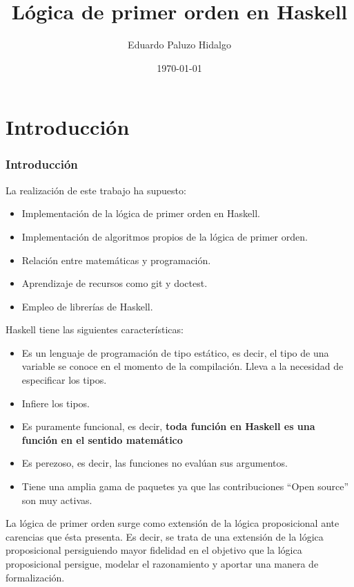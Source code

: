 \documentclass{beamer}
\title[LPO en Haskell]{Lógica de primer orden en Haskell}
\author[Eduardo P.]{Eduardo Paluzo Hidalgo}
\institute[US]{Universidad de Sevilla}
\date{\today}
\begin{document}
 
\frame{\titlepage}

\frame{\tableofcontents}
\section{Introducción}
\begin{frame}
  \frametitle{Introducción}
  La realización de este trabajo ha supuesto:
  \begin{itemize}
  \item Implementación de la lógica de primer orden en Haskell.
  \item Implementación de algoritmos propios de la lógica de primer orden.
  \item Relación entre matemáticas y programación.
  \item Aprendizaje de recursos como git y doctest.
  \item Empleo de librerías de Haskell.
  \end{itemize}
\end{frame}


\begin{frame}
  Haskell tiene las siguientes características:

  \begin{itemize}
  \item Es un lenguaje de programación de tipo estático, es decir, el tipo de una variable
    se conoce en el momento de la compilación. Lleva a la necesidad de especificar los tipos. 
  \item Infiere los tipos.
  \item Es puramente funcional, es decir, \textbf{toda función en Haskell es una función en el sentido matemático}
  \item Es perezoso, es decir, las funciones no evalúan sus argumentos.
  \item Tiene una amplia gama de paquetes ya que las contribuciones ``Open source'' son muy activas. 
  \end{itemize}
\end{frame}

\begin{frame}
  La lógica de primer orden surge como extensión de la lógica proposicional ante carencias que ésta presenta. Es decir, se trata
  de una extensión de la lógica proposicional persiguiendo mayor fidelidad en el objetivo que la lógica proposicional
  persigue, modelar el razonamiento y aportar una manera de formalización.
  
\end{frame}
\end{document}
